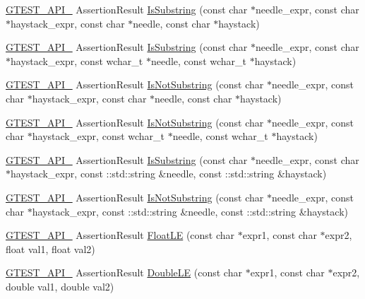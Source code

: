 \begin{DoxyCompactItemize}
\hyperlink{gtest-port_8h_aa73be6f0ba4a7456180a94904ce17790}{G\+T\+E\+S\+T\+\_\+\+A\+P\+I\+\_\+} Assertion\+Result \hyperlink{namespacetesting_a5c90a86562b2470213c07742e0eeb0fe}{Is\+Substring} (const char $\ast$needle\+\_\+expr, const char $\ast$haystack\+\_\+expr, const char $\ast$needle, const char $\ast$haystack)
\item 
\hyperlink{gtest-port_8h_aa73be6f0ba4a7456180a94904ce17790}{G\+T\+E\+S\+T\+\_\+\+A\+P\+I\+\_\+} Assertion\+Result \hyperlink{namespacetesting_a08ce65847491b27a38cbac3ac15e3035}{Is\+Substring} (const char $\ast$needle\+\_\+expr, const char $\ast$haystack\+\_\+expr, const wchar\+\_\+t $\ast$needle, const wchar\+\_\+t $\ast$haystack)
\item 
\hyperlink{gtest-port_8h_aa73be6f0ba4a7456180a94904ce17790}{G\+T\+E\+S\+T\+\_\+\+A\+P\+I\+\_\+} Assertion\+Result \hyperlink{namespacetesting_ab553b649b06ef2339cbd90f8dfa119f0}{Is\+Not\+Substring} (const char $\ast$needle\+\_\+expr, const char $\ast$haystack\+\_\+expr, const char $\ast$needle, const char $\ast$haystack)
\item 
\hyperlink{gtest-port_8h_aa73be6f0ba4a7456180a94904ce17790}{G\+T\+E\+S\+T\+\_\+\+A\+P\+I\+\_\+} Assertion\+Result \hyperlink{namespacetesting_a28868925c50d541c8568a540b6457e54}{Is\+Not\+Substring} (const char $\ast$needle\+\_\+expr, const char $\ast$haystack\+\_\+expr, const wchar\+\_\+t $\ast$needle, const wchar\+\_\+t $\ast$haystack)
\item 
\hyperlink{gtest-port_8h_aa73be6f0ba4a7456180a94904ce17790}{G\+T\+E\+S\+T\+\_\+\+A\+P\+I\+\_\+} Assertion\+Result \hyperlink{namespacetesting_a32718fab95b2833ab5ffc9cfc9f5c8b0}{Is\+Substring} (const char $\ast$needle\+\_\+expr, const char $\ast$haystack\+\_\+expr, const \+::std\+::string \&needle, const \+::std\+::string \&haystack)
\item 
\hyperlink{gtest-port_8h_aa73be6f0ba4a7456180a94904ce17790}{G\+T\+E\+S\+T\+\_\+\+A\+P\+I\+\_\+} Assertion\+Result \hyperlink{namespacetesting_a645d822e47dc64b9923e78c880807f12}{Is\+Not\+Substring} (const char $\ast$needle\+\_\+expr, const char $\ast$haystack\+\_\+expr, const \+::std\+::string \&needle, const \+::std\+::string \&haystack)
\item 
\hyperlink{gtest-port_8h_aa73be6f0ba4a7456180a94904ce17790}{G\+T\+E\+S\+T\+\_\+\+A\+P\+I\+\_\+} Assertion\+Result \hyperlink{namespacetesting_a69106491c2e7f50e50da0ce5e8ae4374}{Float\+LE} (const char $\ast$expr1, const char $\ast$expr2, float val1, float val2)
\item 
\hyperlink{gtest-port_8h_aa73be6f0ba4a7456180a94904ce17790}{G\+T\+E\+S\+T\+\_\+\+A\+P\+I\+\_\+} Assertion\+Result \hyperlink{namespacetesting_a84c020b981d0eb4eabfb0feda155aaaf}{Double\+LE} (const char $\ast$expr1, const char $\ast$expr2, double val1, double val2)

\end{DoxyCompactItemize}
